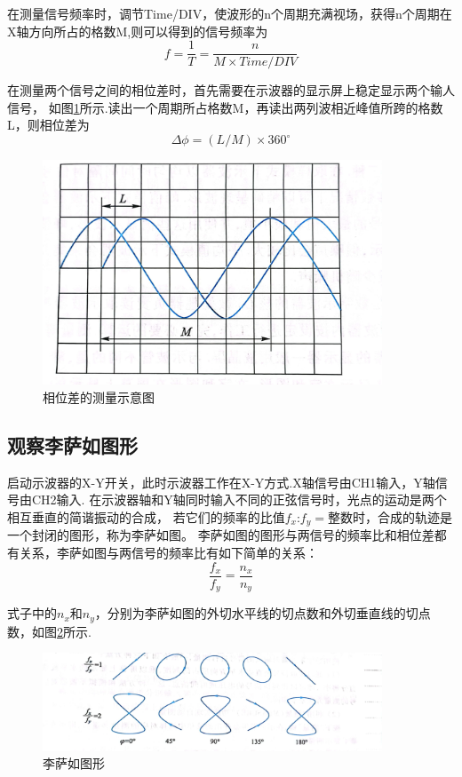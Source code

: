 \documentclass{ctexart}
\begin{document}
  在测量信号频率时，调节Time/DIV，使波形的n个周期充满视场，获得n个周期在X轴方向所占的格数M,则可以得到的信号频率为
  \begin{equation}
    f=\frac{1}{T}=\frac{n}{M\times Time/DIV}
  \end{equation}

  在测量两个信号之间的相位差时，首先需要在示波器的显示屏上稳定显示两个输人信号，
  如图\ref{xiangweichaceliang}所示.读出一个周期所占格数M，再读出两列波相近峰值所跨的格数L，则相位差为
  \begin{equation}
    \Delta \phi =(L/M)\times 360^{\circ} 
  \end{equation}

  \begin{figure}[bt]\label{xiangweichaceliang}
    \centering
    \includegraphics[width=0.9\textwidth,height=0.3\textheight]{xiangweichaceliang.jpg}
    \caption{相位差的测量示意图}
  \end{figure}

  \subsection{观察李萨如图形}
  启动示波器的X-Y开关，此时示波器工作在X-Y方式.X轴信号由CH1输入，Y轴信号由CH2输入.
  在示波器轴和Y轴同时输入不同的正弦信号时，光点的运动是两个相互垂直的简谐振动的合成，
  若它们的频率的比值$f_{x}\mbox{:}f_{y}=\mbox{整数}$时，合成的轨迹是一个封闭的图形，称为李萨如图。
  李萨如图的图形与两信号的频率比和相位差都有关系，李萨如图与两信号的频率比有如下简单的关系：
  \begin{equation}\label{guanxi1}
    \frac{f_{x}}{f_{y}}=\frac{n_{x}}{n_{y}}
  \end{equation}

  式子中的$n_{x}\mbox{和}n_{y}$，分别为李萨如图的外切水平线的切点数和外切垂直线的切点数，如图\ref{lisaru}所示.
  \begin{figure}[H]\label{lisaru}
    \centering
    \includegraphics[width=0.9\textwidth,height=0.3\textheight]{lisaru.jpg}
    \caption{李萨如图形}
  \end{figure}
  
\end{document}
